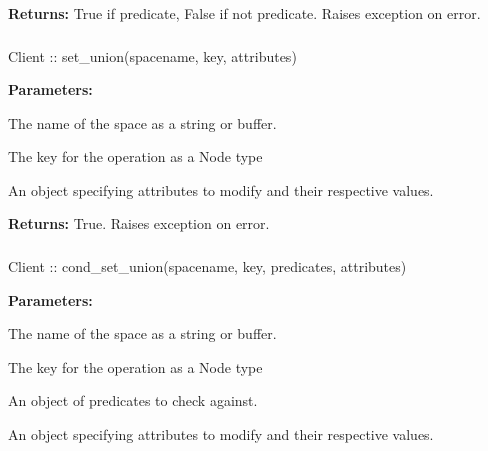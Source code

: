 \noindent\textbf{Returns:}
True if predicate, False if not predicate.  Raises exception on error.

\subsubsection{}
\label{api:nodejs:set_union}
\begin{javascriptcode}
Client :: set_union(spacename, key, attributes)
\end{javascriptcode}
\funcdesc 

\noindent\textbf{Parameters:}
\begin{description}[labelindent=\widthof{{\code{attributes}}},leftmargin=*,noitemsep,nolistsep,align=right]
\item[\code{spacename}] The name of the space as a string or buffer.
\item[\code{key}] The key for the operation as a Node type
\item[\code{attributes}] An object specifying attributes to modify and their respective values.
\end{description}

\noindent\textbf{Returns:}
True.  Raises exception on error.

\subsubsection{}
\label{api:nodejs:cond_set_union}
\begin{javascriptcode}
Client :: cond_set_union(spacename, key, predicates, attributes)
\end{javascriptcode}
\funcdesc 

\noindent\textbf{Parameters:}
\begin{description}[labelindent=\widthof{{\code{predicates}}},leftmargin=*,noitemsep,nolistsep,align=right]
\item[\code{spacename}] The name of the space as a string or buffer.
\item[\code{key}] The key for the operation as a Node type
\item[\code{predicates}] An object of predicates to check against.
\item[\code{attributes}] An object specifying attributes to modify and their respective values.
\end{description}

